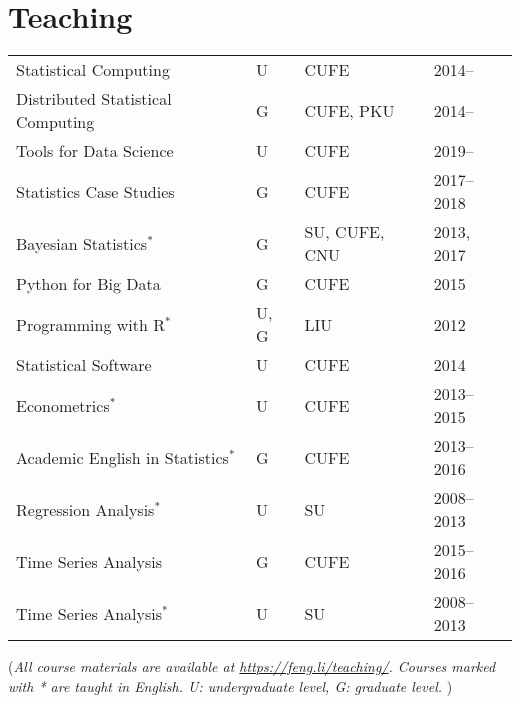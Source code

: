 \documentclass[twoside,a4paper,11pt]{amsart}
\begin{document}
\section*{Teaching}
\begin{center}
\begin{tabular}{p{6.5cm}lll}
  {Statistical Computing} & U& CUFE & 2014--\\
  {Distributed Statistical Computing} & G & CUFE, PKU& 2014--\\
  {Tools for Data Science} & U & CUFE & 2019--\\
  {Statistics Case Studies} & G & CUFE & 2017--2018\\
  {Bayesian Statistics}$^*$&G& SU, CUFE, CNU&2013, 2017\\
  {Python for Big Data} & G & CUFE & 2015\\
  {Programming with R}$^*$&U, G &LIU&  2012\\
  {Statistical Software}&U& CUFE& 2014\\
  {Econometrics}$^*$ & U&  CUFE& 2013--2015\\
  {Academic English in Statistics}$^*$&G&CUFE& 2013--2016\\
  {Regression Analysis}$^*$&U&SU&2008--2013\\
  {Time Series Analysis}& G & CUFE & 2015--2016\\
  {Time Series Analysis}$^*$&U&SU&2008--2013\\
\end{tabular}
\end{center}
{\footnotesize (\emph{All course materials are available at
    \emph{\url{https://feng.li/teaching/}}. Courses marked with * are taught in English. U: undergraduate level, G: graduate level. })}
\end{document}
